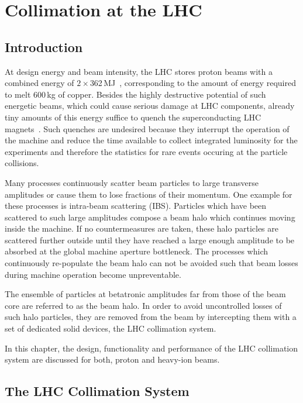 \chapter{Collimation at the LHC}\label{chap:3}
%
\section*{Introduction}
%
At design energy and beam intensity, the LHC stores proton beams with a combined energy of $2 \times $362$\,$MJ~\cite{CERN-2004-003-V1}, corresponding to the amount of energy required to melt 600$\,$kg of copper. Besides the highly destructive potential of such energetic beams, which could cause serious damage at LHC components, already tiny amounts of this energy suffice to quench the superconducting LHC magnets~\cite{}. Such quenches are undesired because they interrupt the operation of the machine and reduce the time available to collect integrated luminosity for the experiments and therefore the statistics for rare events occuring at the particle collisions. 

Many processes continuously scatter beam particles to large transverse amplitudes or cause them to lose fractions of their momentum. One example for these processes is intra-beam scattering (IBS). Particles which have been scattered to such large amplitudes compose a beam halo which continues moving inside the machine. If no countermeasures are taken, these halo particles are scattered further outside until they have reached a large enough amplitude to be absorbed at the global machine aperture bottleneck. The processes which continuously re-populate the beam halo can not be avoided such that beam losses during machine operation become unpreventable. 

The ensemble of particles at betatronic amplitudes far from those of the beam core are referred to as the beam halo. In order to avoid uncontrolled losses of such halo particles, they are removed from the beam by intercepting them with a set of dedicated solid devices, the LHC collimation system. 

In this chapter, the design, functionality and performance of the LHC collimation system are discussed for both, proton and heavy-ion beams.



%
\section{The LHC Collimation System}
